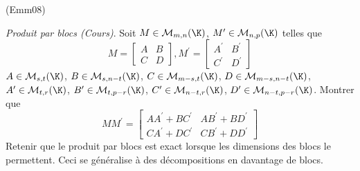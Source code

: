\begin{tiny}(Emm08)\end{tiny}
\emph{Produit par blocs (Cours)}.\newline
Soit $M\in \mathcal{M}_{m,n}(\K)$, $M^{\prime }\in \mathcal{M}_{n,p}(\K)$ telles que
\[
M=\left[
\begin{array}{cc}
A & B \\
C & D
\end{array}
\right] ,M^{\prime }=\left[
\begin{array}{cc}
A^{\prime } & B^{\prime } \\
C^{\prime } & D^{\prime }
\end{array}
\right]
\]
$A\in \mathcal{M}_{s,t}(\K)$, $B\in \mathcal{M}_{s,n-t}(\K)$, $C\in \mathcal{M}_{m-s,t}(\K)$, $D\in \mathcal{M}_{m-s,n-t}(\K)$, $A^{\prime }\in \mathcal{M}_{t,r}(\K)$, $B^{\prime}\in \mathcal{M}_{t,p-r}(\K)$, $C^{\prime }\in \mathcal{M}_{n-t,r}(\K)$, $D^{\prime }\in \mathcal{M}_{n-t,p-r}(\K)$.\newline
Montrer que
\[
MM^{\prime }=\left[
\begin{array}{cc}
AA^{\prime }+BC^{\prime } & AB^{\prime }+BD^{\prime } \\
CA^{\prime }+DC^{\prime } & CB^{\prime }+DD^{\prime }
\end{array}
\right]
\]
Retenir que le produit par blocs est exact lorsque les dimensions des blocs
le permettent. Ceci se g{\'e}n{\'e}ralise {\`a} des d{\'e}compositions en
davantage de blocs.
